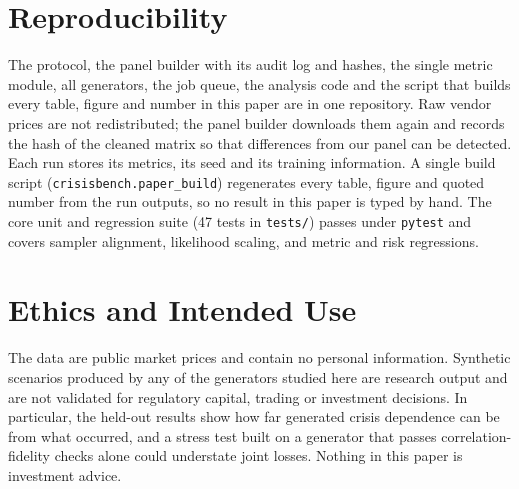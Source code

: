\documentclass[journal]{IEEEtran}
\begin{document}
\section{Reproducibility}
The protocol, the panel builder with its audit log and hashes, the single metric module, all generators, the
job queue, the analysis code and the script that builds every table, figure and number in this paper are in one
repository. Raw vendor prices are not redistributed; the panel builder downloads them again and records the
hash of the cleaned matrix so that differences from our panel can be detected. Each run stores its metrics, its
seed and its training information. A single build script (\texttt{crisisbench.paper\_build}) regenerates every
table, figure and quoted number from the run outputs, so no result in this paper is typed by hand. The core
unit and regression suite (47 tests in \texttt{tests/}) passes under \texttt{pytest} and covers sampler
alignment, likelihood scaling, and metric and risk regressions.

\section{Ethics and Intended Use}
The data are public market prices and contain no personal information. Synthetic scenarios produced by any of
the generators studied here are research output and are not validated for regulatory capital, trading or
investment decisions. In particular, the held-out results show how far generated crisis dependence can be from
what occurred, and a stress test built on a generator that passes correlation-fidelity checks alone could
understate joint losses. Nothing in this paper is investment advice.

\end{document}
